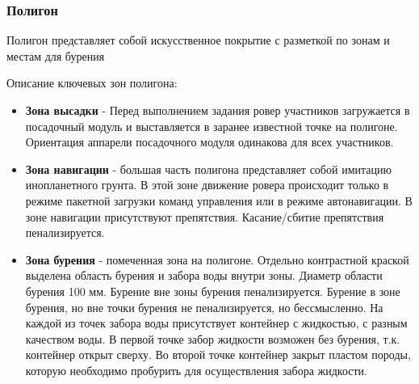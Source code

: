 \subsubsection*{Полигон}


Полигон представляет собой искусственное покрытие с разметкой по зонам и местам для бурения

Описание ключевых зон полигона:
\begin{itemize}
    \item \textbf{Зона высадки} - Перед выполнением задания ровер участников загружается в посадочный модуль и выставляется в заранее известной точке на полигоне. Ориентация аппарели посадочного модуля одинакова для всех участников.
    \item \textbf{Зона навигации} - большая часть полигона представляет собой имитацию инопланетного грунта. В этой зоне движение ровера происходит только в режиме пакетной загрузки команд управления или в режиме автонавигации. В зоне навигации присутствуют препятствия. Касание/сбитие препятствия пенализируется.
    \item \textbf{Зона бурения} - помеченная зона на полигоне. Отдельно контрастной краской выделена область бурения и забора воды внутри зоны. Диаметр области бурения 100 мм. Бурение вне зоны бурения пенализируется. Бурение в зоне бурения, но вне точки бурения не пенализируется, но бессмысленно. На каждой из точек забора воды присутствует контейнер с жидкостью, с разным качеством воды. В первой точке забор жидкости возможен без бурения, т.к. контейнер открыт сверху. Во второй точке контейнер закрыт пластом породы, которую необходимо пробурить для осуществления забора жидкости.
\end{itemize}